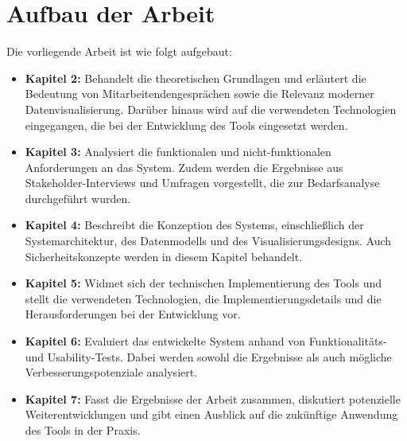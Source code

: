 \section{Aufbau der Arbeit}
Die vorliegende Arbeit ist wie folgt aufgebaut:
\begin{itemize}
    \item \textbf{Kapitel 2:} Behandelt die theoretischen Grundlagen und erläutert die Bedeutung von Mitarbeitendengesprächen sowie die Relevanz moderner Datenvisualisierung. Darüber hinaus wird auf die verwendeten Technologien eingegangen, die bei der Entwicklung des Tools eingesetzt werden.
    \item \textbf{Kapitel 3:} Analysiert die funktionalen und nicht-funktionalen Anforderungen an das System. Zudem werden die Ergebnisse aus Stakeholder-Interviews und Umfragen vorgestellt, die zur Bedarfsanalyse durchgeführt wurden.
    \item \textbf{Kapitel 4:} Beschreibt die Konzeption des Systems, einschließlich der Systemarchitektur, des Datenmodells und des Visualisierungsdesigns. Auch Sicherheitskonzepte werden in diesem Kapitel behandelt.
    \item \textbf{Kapitel 5:} Widmet sich der technischen Implementierung des Tools und stellt die verwendeten Technologien, die Implementierungsdetails und die Herausforderungen bei der Entwicklung vor.
    \item \textbf{Kapitel 6:} Evaluiert das entwickelte System anhand von Funktionalitäts- und Usability-Tests. Dabei werden sowohl die Ergebnisse als auch mögliche Verbesserungspotenziale analysiert.
    \item \textbf{Kapitel 7:} Fasst die Ergebnisse der Arbeit zusammen, diskutiert potenzielle Weiterentwicklungen und gibt einen Ausblick auf die zukünftige Anwendung des Tools in der Praxis.
\end{itemize}
